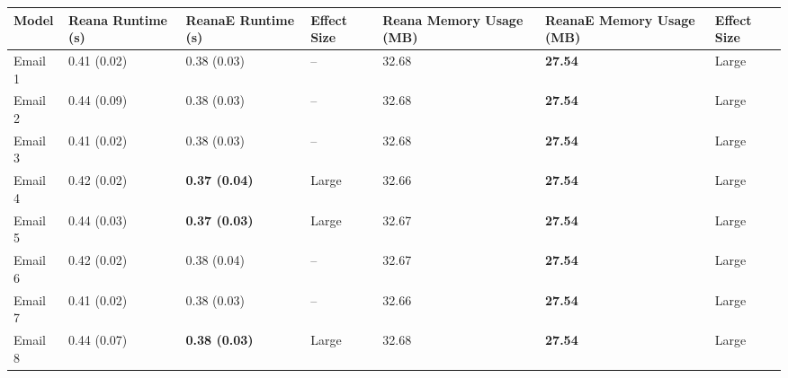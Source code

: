 \begin{tabular}{lllllll}
\toprule
   Model & Reana Runtime (s) &    ReanaE Runtime (s) & Effect Size & Reana Memory Usage (MB) & ReanaE Memory Usage (MB) & Effect Size \\
\midrule
 Email 1 &       0.41 (0.02) &           0.38 (0.03) &          -- &                   32.68 &           \textbf{27.54} &       Large \\
 Email 2 &       0.44 (0.09) &           0.38 (0.03) &          -- &                   32.68 &           \textbf{27.54} &       Large \\
 Email 3 &       0.41 (0.02) &           0.38 (0.03) &          -- &                   32.68 &           \textbf{27.54} &       Large \\
 Email 4 &       0.42 (0.02) &  \textbf{0.37 (0.04)} &       Large &                   32.66 &           \textbf{27.54} &       Large \\
 Email 5 &       0.44 (0.03) &  \textbf{0.37 (0.03)} &       Large &                   32.67 &           \textbf{27.54} &       Large \\
 Email 6 &       0.42 (0.02) &           0.38 (0.04) &          -- &                   32.67 &           \textbf{27.54} &       Large \\
 Email 7 &       0.41 (0.02) &           0.38 (0.03) &          -- &                   32.66 &           \textbf{27.54} &       Large \\
 Email 8 &       0.44 (0.07) &  \textbf{0.38 (0.03)} &       Large &                   32.68 &           \textbf{27.54} &       Large \\
\bottomrule
\end{tabular}
